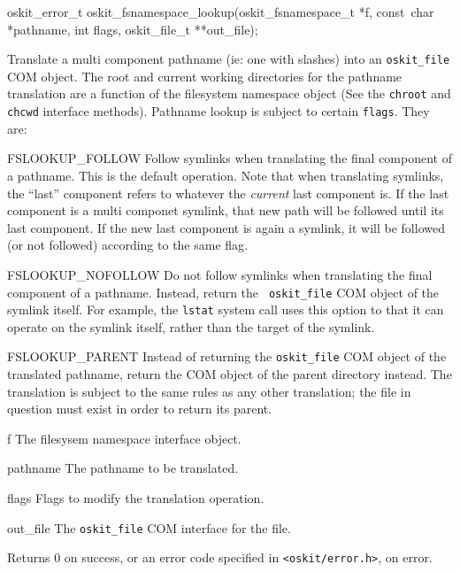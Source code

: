 \begin{apisyn}

	\funcproto oskit_error_t
	oskit_fsnamespace_lookup(oskit_fsnamespace_t *f,
				const~char *pathname, int flags,
				\outparam oskit_file_t **out_file);
\end{apisyn}
\begin{apidesc}
	Translate a multi component pathname (ie: one with slashes) into an
	{\tt oskit_file} COM object. The root and current working
	directories for the pathname translation are a function of the
	filesystem namespace object (See the \texttt{chroot} and
	\texttt{chcwd} interface methods). Pathname lookup is subject to
	certain \texttt{flags}. They are:

	\begin{icsymlist}
	\item[FSLOOKUP_FOLLOW] Follow symlinks when translating the final
	component of a pathname. This is the default operation. Note that
	when translating symlinks, the ``last'' component refers to
	whatever the \emph{current} last component is. If the last component
	is a multi componet symlink, that new path will be followed until
	its last component. If the new last component is again a symlink,
	it will be followed (or not followed) according to the same flag. 

	\item[FSLOOKUP_NOFOLLOW] Do not follow symlinks when translating
	the final component of a pathname. Instead, return the {\tt
	oskit_file} COM object of the symlink itself. For example, the
	\texttt{lstat} system call uses this option to that it can operate
	on the symlink itself, rather than the target of the symlink. 

	\item[FSLOOKUP_PARENT] Instead of returning the {\tt oskit_file}
	COM object of the translated pathname, return the COM object of the
	parent directory instead. The translation is subject to the same
	rules as any other translation; the file in question must exist in
	order to return its parent.
	\end{icsymlist}
\end{apidesc}
\begin{apiparm}
	\item[f]
		The \oskit{} filesysem namespace interface object.
	\item[pathname]
		The pathname to be translated.
	\item[flags]
		Flags to modify the translation operation.
	\item[out_file]
		The {\tt oskit_file} COM interface for the file.
\end{apiparm}
\begin{apiret}
	Returns 0 on success, or an error code specified in
	{\tt <oskit/error.h>}, on error.
\end{apiret}


